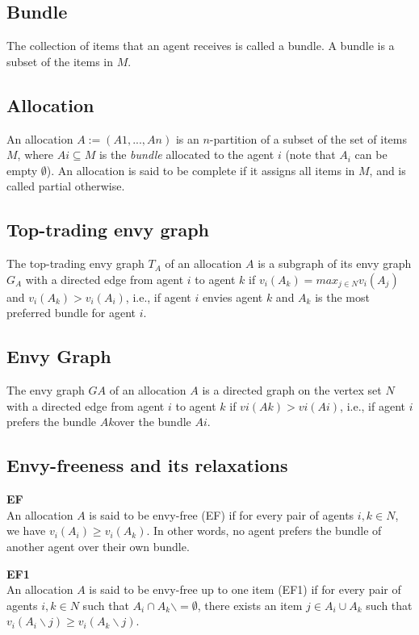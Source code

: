 \subsection*{Bundle}
The collection of items that an agent receives is called a bundle. A bundle is a subset of the items in $M$.



\subsection*{Allocation}
An allocation $A := (A1,...,An)$ is an $n$-partition of a subset of the set of items $M$, where $Ai \subseteq M$ is the \textit{bundle} allocated to the agent $i$ (note that $A_i$ can be empty $\emptyset$). An allocation is said to be complete if it assigns all items in $M$, and is called partial otherwise.



\subsection*{Top-trading envy graph}
The top-trading envy graph $T_A$ of an allocation $A$ is a subgraph of its envy graph $G_A$ with a directed edge from agent $i$ to agent $k$ if $v_i(A_k) = max_{j\in N} v_i(A_j)$ and $v_i(A_k) > v_i(A_i)$, i.e., if agent $i$ envies agent $k$ and $A_k$ is the most preferred bundle for agent $i$.



\subsection*{Envy Graph}
The envy graph $GA$ of an allocation $A$ is a directed graph on the vertex set $N$ with a directed edge from agent $i$ to agent $k$ if $vi(Ak) > vi(Ai)$, i.e., if agent $i$ prefers the bundle $Ak$over the bundle $Ai$.



\subsection*{Envy-freeness and its relaxations}
\textbf{EF}\\
An allocation $A$ is said to be envy-free (EF) if for every pair of agents $i,k \in N$, we have $v_i(A_i) \geq v_i(A_k)$. In other words, no agent prefers the bundle of another agent over their own bundle.

\textbf{EF1}\\
An allocation $A$ is said to be envy-free up to one item (EF1) if for every pair of agents $i, k \in N$ such that $A_i \cap A_k \backslash= \emptyset$, there exists an item $j \in A_i \cup A_k$ such that $v_i(A_i \backslash {j}) \geq v_i(A_k \backslash {j})$. 

